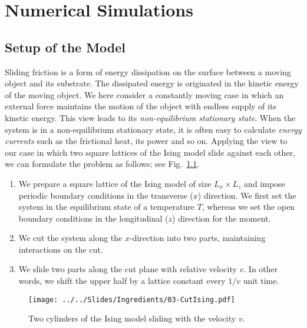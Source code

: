 \chapter{Numerical Simulations}\label{chap:NumSim}

\section{Setup of the Model}\label{sec:SetupModel}
Sliding friction is a form of energy dissipation on the surface between a moving object and its substrate. The dissipated energy is originated in the kinetic energy of the moving object. We here consider a constantly moving case in which an external force maintains the motion of the object with endless supply of its kinetic energy. This view leads to its \textit{non-equilibrium stationary state}. When the system is in a non-equilibrium stationary state, it is often easy to calculate \textit{energy currents} such as the frictional heat, its power and so on. Applying the view to our case in which two square lattices of the Ising model slide against each other, we can formulate the problem as follows; see Fig.~\ref{fig:CutIsing}.
\begin{enumerate}
	\item We prepare a square lattice of the Ising model of size $L_{x}\times L_{z}$ and impose periodic boundary conditions in the transverse ($x$) direction. We first set the system in the equilibrium state of a temperature $T$, whereas we set the open boundary conditions in the longitudinal ($z$) direction for the moment.
	\item We cut the system along the $x$-direction into two parts, maintaining interactions on the cut.
	\item We slide two parts along the cut plane with relative velocity $v$. In other words, we shift the upper half by a lattice constant every $1/v$ unit time. 
\end{enumerate}

\begin{figure}[htbp]
	\centering
	\texttt{[image: ../../Slides/Ingredients/03-CutIsing.pdf]}
	\caption{Two cylinders of the Ising model sliding with the velocity $v$.}
	\label{fig:CutIsing}
\end{figure}

